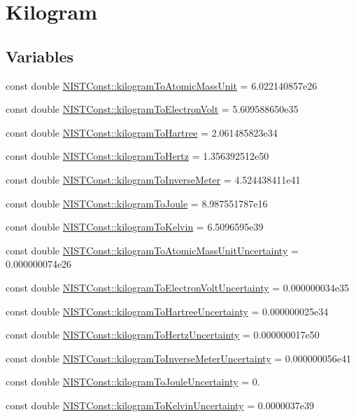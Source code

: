 \hypertarget{group___kilogram}{}\section{Kilogram}
\label{group___kilogram}
\subsection*{Variables}
\begin{DoxyCompactItemize}
\item 
const double \hyperlink{group___kilogram_gaa6a5187e436c3ce769319ad4968d53ff}{N\+I\+S\+T\+Const\+::kilogram\+To\+Atomic\+Mass\+Unit} = 6.\+022140857e26
\item 
const double \hyperlink{group___kilogram_gae0d25d28f6a0596f2dd5f8b3dc5ebb38}{N\+I\+S\+T\+Const\+::kilogram\+To\+Electron\+Volt} = 5.\+609588650e35
\item 
const double \hyperlink{group___kilogram_gaa1f73e0db10cccf2a4c86dbd360e49a8}{N\+I\+S\+T\+Const\+::kilogram\+To\+Hartree} = 2.\+061485823e34
\item 
const double \hyperlink{group___kilogram_gaf543ce948a71df1884a8f240106c3c33}{N\+I\+S\+T\+Const\+::kilogram\+To\+Hertz} = 1.\+356392512e50
\item 
const double \hyperlink{group___kilogram_gaeb262618c1568d210f8a5a8fdca39ae2}{N\+I\+S\+T\+Const\+::kilogram\+To\+Inverse\+Meter} = 4.\+524438411e41
\item 
const double \hyperlink{group___kilogram_gaf3635d5c9747ebcd2edadf77388fea9b}{N\+I\+S\+T\+Const\+::kilogram\+To\+Joule} = 8.\+987551787e16
\item 
const double \hyperlink{group___kilogram_ga79d71b550888761f76eaca5ffc4a29cb}{N\+I\+S\+T\+Const\+::kilogram\+To\+Kelvin} = 6.\+5096595e39
\item 
const double \hyperlink{group___kilogram_ga0a840aeb3ea862ed078ead0caf886dfb}{N\+I\+S\+T\+Const\+::kilogram\+To\+Atomic\+Mass\+Unit\+Uncertainty} = 0.\+000000074e26
\item 
const double \hyperlink{group___kilogram_ga1bc5e8f6c0c532f454e143a589a532dc}{N\+I\+S\+T\+Const\+::kilogram\+To\+Electron\+Volt\+Uncertainty} = 0.\+000000034e35
\item 
const double \hyperlink{group___kilogram_ga62cf42463d1d0306ae8656649434be2b}{N\+I\+S\+T\+Const\+::kilogram\+To\+Hartree\+Uncertainty} = 0.\+000000025e34
\item 
const double \hyperlink{group___kilogram_ga692cf4dd08ad49aee0b148a1353c1776}{N\+I\+S\+T\+Const\+::kilogram\+To\+Hertz\+Uncertainty} = 0.\+000000017e50
\item 
const double \hyperlink{group___kilogram_ga645bb9b0850ae8c2ac2fbf8d480bc013}{N\+I\+S\+T\+Const\+::kilogram\+To\+Inverse\+Meter\+Uncertainty} = 0.\+000000056e41
\item 
const double \hyperlink{group___kilogram_gacf96db99d7b828aca5c24fda34406550}{N\+I\+S\+T\+Const\+::kilogram\+To\+Joule\+Uncertainty} = 0.
\item 
const double \hyperlink{group___kilogram_ga744389701b8d90c75aa01618867ed42e}{N\+I\+S\+T\+Const\+::kilogram\+To\+Kelvin\+Uncertainty} = 0.\+0000037e39
\end{DoxyCompactItemize}


